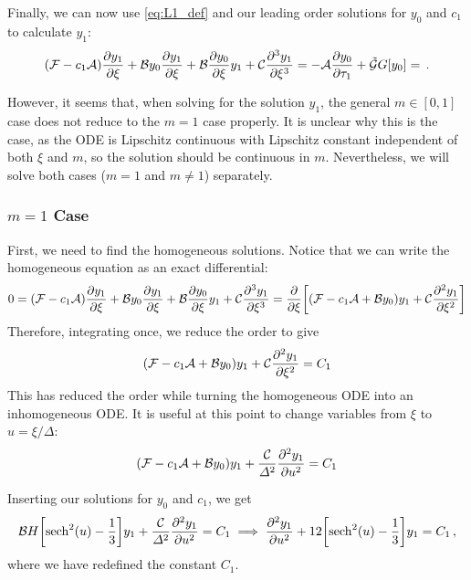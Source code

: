 \documentclass{jfm}
\let\Oldsubsubsection\subsubsection
\renewcommand{\subsubsection}{\FloatBarrier\Oldsubsubsection}
\begin{document}
Finally, we can now use \cref{eq:L1_def} and our leading order solutions
for $y_0$ and $c_1$ to calculate $y_1$:
\begin{equation}
  \pqty{\mathcal{F} -c_1 \mathcal{A}} \pdv{y_1}{\xi}
    + \mathcal{B} y_0 \pdv{y_1}{\xi}
    + \mathcal{B} \pdv{y_0}{\xi} y_1
    + \mathcal{C} \pdv[3]{y_1}{\xi}
  = - \mathcal{A} \pdv{y_0}{\tau_1}
    + \mathcal{\tilde{G}} G[y_0]
  = \,.
  \label{eq:kdv_inhom}
\end{equation}

However, it seems that, when solving for the solution $y_1$, the general
$m \in [0,1]$ case does not reduce to the $m=1$ case properly.
It is unclear why this is the case, as the ODE is Lipschitz continuous
with Lipschitz constant independent of both $\xi$ and $m$, so the
solution should be continuous in $m$.
Nevertheless, we will solve both cases ($m=1$ and $m \neq 1$)
separately.

\subsubsection{\texorpdfstring{$m=1$}{Solitary Wave} Case}
First, we need to find the homogeneous solutions.
Notice that we can write the homogeneous equation as an exact
differential:
\begin{equation}
  0 = \pqty{\mathcal{F} -c_1 \mathcal{A}} \pdv{y_1}{\xi}
    + \mathcal{B} y_0 \pdv{y_1}{\xi}
    + \mathcal{B} \pdv{y_0}{\xi} y_1
    + \mathcal{C} \pdv[3]{y_1}{\xi}
  = \pdv{\xi} \bqty{
    \pqty{\mathcal{F} -c_1 \mathcal{A} + \mathcal{B} y_0} y_1
    + \mathcal{C} \pdv[2]{y_1}{\xi}
    }
\end{equation}
Therefore, integrating once, we reduce the order to give
\begin{equation}
    \pqty{\mathcal{F} -c_1 \mathcal{A} + \mathcal{B} y_0} y_1
    + \mathcal{C} \pdv[2]{y_1}{\xi}
    = C_1
\end{equation}
This has reduced the order while turning the homogeneous ODE into an
inhomogeneous ODE.
It is useful at this point to change variables from $\xi$ to $u =
\xi/\Delta$:
\begin{equation}
    \pqty{\mathcal{F} -c_1 \mathcal{A} + \mathcal{B} y_0} y_1
    + \frac{\mathcal{C}}{\Delta^2} \pdv[2]{y_1}{u}
    = C_1
\end{equation}

Inserting our solutions for $y_0$ and $c_1$, we get
\begin{equation}
  \mathcal{B} H \bqty{\sech^2 (u) - \frac{1}{3}} y_1
    + \frac{\mathcal{C}}{\Delta^2} \pdv[2]{y_1}{u} = C_1
  \implies
  \pdv[2]{y_1}{u} + 12 \bqty{\sech^2 (u) - \frac{1}{3}} y_1 = C_1 \,,
\end{equation}
where we have redefined the constant $C_1$.
\end{document}
